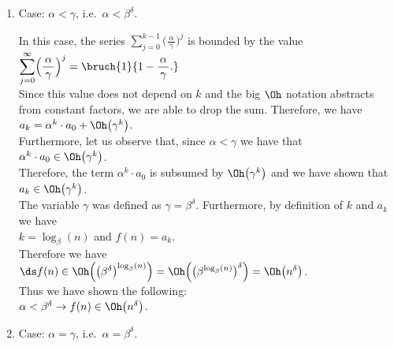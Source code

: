 \begin{enumerate}
\item Case: $\alpha < \gamma$, i.e.~$\alpha < \beta^\delta$.

      In this case, the series $\sum\limits_{j=0}^{k-1} \bigl(\frac{\,\alpha\,}{\gamma}\bigr)^j$ is bounded 
      by the value
      \\[0.2cm]
      \hspace*{1.3cm}
      $\displaystyle \sum\limits_{j=0}^{\infty} \Bigl(\frac{\,\alpha\,}{\gamma}\Bigr)^j = \bruch{1}{1 - \frac{\,\alpha\,}{\gamma}.}$
      \\[0.2cm]
      Since this value does not depend on $k$ and the big $\Oh$ notation abstracts from constant factors,
      we are able to drop the sum.  Therefore, we have
      \\[0.2cm]
      \hspace*{1.3cm}
      $a_k = \alpha^k \cdot a_0 + \Oh\bigl(\gamma^k\bigr)$.
      \\[0.2cm] 
      Furthermore, let us observe that, since $\alpha < \gamma$ we have that 
      \\[0.2cm]
      \hspace*{1.3cm}
      $\alpha^k \cdot a_0 \in \Oh\bigl(\gamma^k\bigr)$.
      \\[0.2cm]
      Therefore, the term $\alpha^k \cdot a_0$ is subsumed by $\Oh\bigl(\gamma^k\bigr)$ and we have shown that
      \\[0.2cm]
      \hspace*{1.3cm}
      $a_k \in \Oh\bigl(\gamma^k\bigr)$.
      \\[0.2cm]
      The variable $\gamma$ was defined as $\gamma = \beta^\delta$.  Furthermore, by definition of $k$ and $a_k$
      we have 
      \\[0.2cm]
      \hspace*{1.3cm}
      $k = \log_{\beta}(n)$ \quad and \quad $f(n) = a_k$.  
      \\[0.2cm]
      Therefore we have 
      \\[0.2cm]
      \hspace*{1.3cm}
      $\ds f(n) \in \Oh\Bigl(\bigl(\beta^\delta\bigr)^{\log_{\beta}(n)}\Bigr) = \Oh\Bigl(\bigl(\beta^{\log_{\beta}(n)}\bigr)^\delta\Bigr) = \Oh\bigl(n^\delta\bigr)$.
      \\[0.2cm] 
      Thus we have shown the following:
      \\[0.2cm]
      \hspace*{1.3cm}
      $\alpha < \beta^\delta \rightarrow f(n) \in \Oh\bigl(n^\delta\bigr)$.
\item Case: $\alpha = \gamma$, i.e.~$\alpha = \beta^\delta$.


\end{enumerate}
